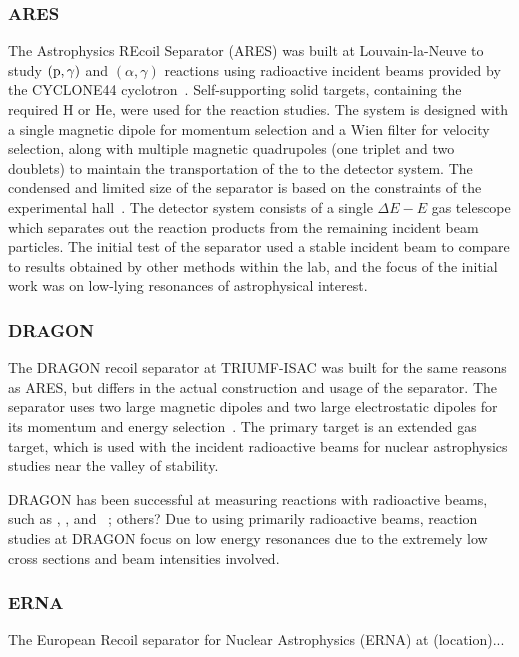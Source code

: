 \subsubsection{ARES}
The Astrophysics REcoil Separator (ARES) was built at Louvain-la-Neuve to
study $(\rm{p},\gamma)$ and $(\alpha,\gamma)$ reactions using radioactive
incident beams provided by the CYCLONE44 cyclotron~\cite{Angulo2001}.
Self-supporting solid targets, containing the required H or He, were used for
the reaction studies. The system is designed with a single magnetic dipole for
momentum selection and a Wien filter for velocity selection, along with
multiple magnetic quadrupoles (one triplet and two doublets) to maintain the
transportation of the to the
detector system. The condensed and limited size of the separator is based on
the constraints of the experimental hall~\cite{Couder2003}. The detector system
consists of a single $\Delta E − E$ gas telescope which separates out the reaction
products from the remaining incident beam particles. The initial test of the
separator used a stable incident beam to compare to results obtained by other
methods within the lab, and the focus of the initial work was on low-lying
resonances of astrophysical interest.


\subsubsection{DRAGON}
The DRAGON recoil separator at TRIUMF-ISAC was built for the same reasons as ARES,
but differs in the actual construction and usage of the separator. The
separator uses two large magnetic dipoles and two large electrostatic dipoles
for its momentum and energy selection~\cite{Engel2005}. The primary target is
an extended gas target, which is used with the incident radioactive beams for
nuclear astrophysics studies near the valley of stability.

DRAGON has been successful at measuring reactions with radioactive beams, such
as ,
, and
~\cite{Engel2005}; others?
Due to using primarily radioactive beams, reaction studies at DRAGON focus on
low energy resonances due to the extremely low cross sections and beam
intensities involved.


\subsubsection{ERNA}
The European Recoil separator for Nuclear Astrophysics (ERNA) at (location)...


